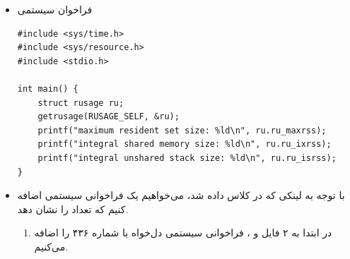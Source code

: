 \begin{itemize}
		\item فراخوان سیستمی 
			\begin{Verbatim}[tabsize=4]
#include <sys/time.h>
#include <sys/resource.h>
#include <stdio.h>

int main() {
	struct rusage ru;
	getrusage(RUSAGE_SELF, &ru);
	printf("maximum resident set size: %ld\n", ru.ru_maxrss);
	printf("integral shared memory size: %ld\n", ru.ru_ixrss);
	printf("integral unshared stack size: %ld\n", ru.ru_isrss);
}
			\end{Verbatim}
	\end{itemize}


	\begin{itemize}
		\item با توجه به لینکی که در کلاس داده شد، می‌خواهیم یک فراخوانی سیستمی اضافه کنیم که تعداد  را نشان دهد.
		\begin{enumerate}
			\item
				 در ابتدا به ۲ فایل  و ، فراخوانی سیستمی دل‌خواه با شماره ۴۳۶ را اضافه می‌کنیم.
				

\end{enumerate}
\end{itemize}
